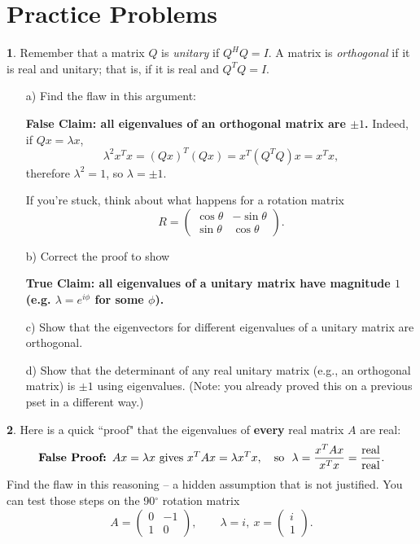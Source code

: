 \documentclass{article}
\theoremstyle{definition}
\newtheorem{prob}{}
\begin{document}
\section*{Practice Problems}
\begin{prob} Remember that a matrix $Q$ is \emph{unitary} if $Q^HQ = I$. A matrix is \emph{orthogonal} if it is real and unitary; that is, if it is real and $Q^TQ=I$.
\begin{itemize}
	\item[a)] Find the flaw in this argument:
	
	 \textbf{False Claim: all eigenvalues of an orthogonal matrix are $\pm 1$.}  Indeed, if $Qx = \lambda x$,
	\[\lambda^2 x^T x = (Qx)^T (Qx) = x^T (Q^T Q) x = x^Tx, \]
	therefore $\lambda^2 = 1$, so $\lambda = \pm 1$. 
	
	 If you're stuck, think about what happens for a rotation matrix
	\[ R = \begin{pmatrix} \cos \theta & -\sin \theta \\ \sin \theta & \cos \theta \end{pmatrix}.\]
	
	\item[b)] Correct the proof to show 
	
	\textbf{True Claim: all eigenvalues of a unitary matrix have magnitude $1$ (e.g. $\lambda = e^{i \phi}$ for some $\phi$).}
	
	\item[c)] Show that the eigenvectors for different eigenvalues of a unitary matrix are orthogonal.
	
	\item[d)] Show that the determinant of any real unitary matrix (e.g., an orthogonal matrix) is $\pm 1$ using eigenvalues.  (Note: you already proved this on a previous pset in a different way.)
	
\end{itemize}
\end{prob}


\begin{prob}
Here is a quick ``proof" that the eigenvalues of \textbf{every} real matrix $A$ are real:
\[\text{\textbf{False Proof: }} Ax = \lambda x \text{ gives } x^TAx = \lambda x^Tx, \quad \text{so } \ \lambda  = \frac{ x^TAx}{x^Tx} = \frac{\text{real}}{\text{real}}.\]
Find the flaw in this reasoning -- a hidden assumption that is not justified.  You can test those steps on the 90${}^\circ$ rotation matrix
\[ A = \begin{pmatrix} 0 & -1 \\  1 & 0 \end{pmatrix}, \qquad \lambda =  i, \ x = \begin{pmatrix} i \\ 1 \end{pmatrix}.\]
\end{prob}
\end{document}
